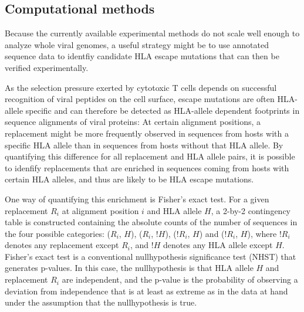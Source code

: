 \documentclass[fleqn,11pt]{SelfArx} %
\begin{document}
\subsection{Computational methods}

Because the currently available experimental methods do not scale well enough to analyze
whole viral genomes, a useful strategy might be to use annotated sequence data to identfiy 
candidate HLA escape mutations that can then be verified experimentally.

As the selection pressure exerted by cytotoxic T cells depends on successful recognition
of viral peptides on the cell surface, escape mutations are often HLA-allele specific
and can therefore be detected as HLA-allele dependent footprints in sequence
alignments of viral proteins\nolinebreak\cite{Moore2002}: At certain alignment positions, a replacement
might be more frequently observed in sequences from hosts with a specific HLA allele than in 
sequences from hosts without that HLA allele. By quantifying this difference
for all replacement and HLA allele pairs, it is possible to idenfify replacements that
are enriched in sequences coming from hosts with certain HLA alleles, and thus are
likely to be HLA escape mutations.

One way of quantifying this enrichment is Fisher's exact test\nolinebreak\cite{Fisher1922}.
For a given replacement \(R_{i}\) at alignment position \(i\) and HLA allele \(H\),
a 2-by-2 contingency table is constructed containing the absolute counts of the
number of sequences in the four possible categories: 
(\(R_{i}\), \(H\)), (\(R_{i}\), \(!H\)), (\(!R_{i}\), \(H\)) and (\(!R_{i}\), \(H\)),
where \(!R_{i}\) denotes any replacement except \(R_{i}\), and \(!H\) denotes any HLA allele
except \(H\).
Fisher's exact test is a conventional nullhypothesis significance test (NHST) that
generates p-values. In this case, the nullhypothesis is that HLA allele \(H\) and 
replacement \(R_{i}\) are independent, and the p-value is the probability of
observing a deviation from independence that is at least as extreme as in the data at hand
under the assumption that the nullhypothesis is true.
\end{document}
